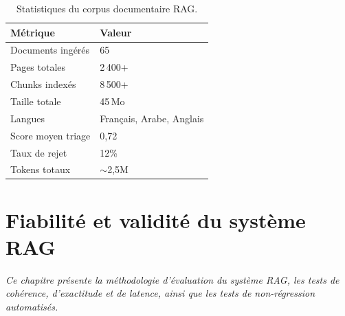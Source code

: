 \documentclass[12pt,a4paper,oneside]{report}
\newcommand{\chaptercolor}{mainblue}
\newcommand{\setchaptercolor}[1]{\renewcommand{\chaptercolor}{#1}}
\newcommand{\chapterabstract}[1]{\vspace{-0.5cm}\begin{center}\begin{minipage}{0.9\textwidth}\small\itshape\textcolor{\chaptercolor!70!black}{#1}\end{minipage}\end{center}\vspace{0.5cm}}
\begin{document}
\begin{table}[htbp]\centering

\begin{tabular}{@{}ll@{}}

\toprule

\textbf{M\'{e}trique} & \textbf{Valeur} \\

\midrule

Documents ing\'{e}r\'{e}s & 65 \\

Pages totales & 2\,400+ \\

Chunks index\'{e}s & 8\,500+ \\

Taille totale & 45\,Mo \\

Langues & Fran\c{c}ais, Arabe, Anglais \\

Score moyen triage & 0,72 \\

Taux de rejet & 12\% \\

Tokens totaux & $\sim$2,5M \\

\bottomrule

\end{tabular}

\caption{Statistiques du corpus documentaire RAG.}\label{tab:corpus_stats}

\end{table}






\setchaptercolor{teal}

\chapter{Fiabilit\'{e} et validit\'{e} du syst\`{e}me RAG}

\chapterabstract{Ce chapitre pr\'{e}sente la m\'{e}thodologie d'\'{e}valuation du syst\`{e}me RAG, les tests de coh\'{e}rence, d'exactitude et de latence, ainsi que les tests de non-r\'{e}gression automatis\'{e}s.}
\end{document}
